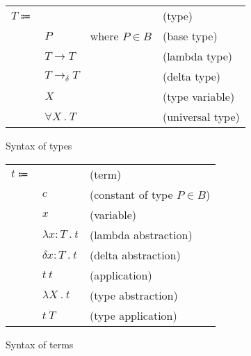 \documentclass[acmlarge]{acmart}
\begin{document}
  \newcommand\labs[2]{\lambda #1 \ . \ #2}
  \newcommand\dabs[2]{\delta #1 \ . \ #2}
  \newcommand\lapp[2]{#1 \ #2}
  \newcommand\lsub[3]{#1 \left[ #2 \mapsto #3 \right]}
  \newcommand\lprovide[2]{\text{provide } #1 \text{ in } #2}

  \newcommand\evalsto[2]{#1 \longrightarrow #2}

  \newcommand\tarrow[2]{#1 \rightarrow #2}
  \newcommand\tforall[2]{\forall #1 \ . \ #2}

  \begin{figure}[h!]
    \begin{mdframed}

      \begin{tabular}{l l l l}
        $T \Coloneqq $ & & & (type) \\
        & $P$ & where $P \in B$ & (base type) \\
        & $T \rightarrow T$ & & (lambda type) \\
        & $T \rightarrow_{\delta} T$ & & (delta type) \\
        & $X$ & & (type variable) \\
        & $\tforall{X}{T}$ & & (universal type) \\
      \end{tabular}

    \end{mdframed}
    \caption{Syntax of types}
    \label{fig:types_syntax}
  \end{figure}

  \begin{figure}[h!]
    \begin{mdframed}

      \begin{tabular}{l l l}
        $t \Coloneqq $ & & (term) \\
        & $c$ & (constant of type $P \in B$) \\
        & $x$ & (variable) \\
        & $\labs{x : T}{t}$ & (lambda abstraction) \\
        & $\dabs{x : T}{t}$ & (delta abstraction) \\
        & $\lapp{t}{t}$ & (application) \\
        & $\labs{X}{t}$ & (type abstraction) \\
        & $\lapp{t}{T}$ & (type application) \\
      \end{tabular}

    \end{mdframed}
    \caption{Syntax of terms}
    \label{fig:terms_syntax}
  \end{figure}
\end{document}

